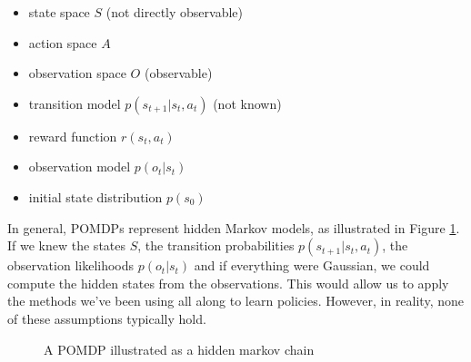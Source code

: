 \begin{itemize}
    \item state space $S$ (not directly observable)
    \item action space $A$
    \item observation space $O$ (observable)
    \item transition model $p(s_{t+1}|s_t,a_t)$ (not known)
    \item reward function $r(s_t,a_t)$
    \item observation model $p(o_t|s_t)$
    \item initial state distribution $p(s_0)$
\end{itemize}
In general, POMDPs represent hidden Markov models, as illustrated in Figure 
\ref{pomdp_hmm}. If we knew the states $S$, the transition probabilities 
$p(s_{t+1}|s_t,a_t)$, the observation likelihoods $p(o_t|s_t)$ and if everything were 
Gaussian, we could compute the hidden states from the observations. This would allow us to 
apply the methods we've been using all along to learn policies. However, in reality, none 
of these assumptions typically hold.
\begin{figure}[H]
    \centering
{}
    \caption{A POMDP illustrated as a hidden markov chain}
    \label{pomdp_hmm}
\end{figure}
